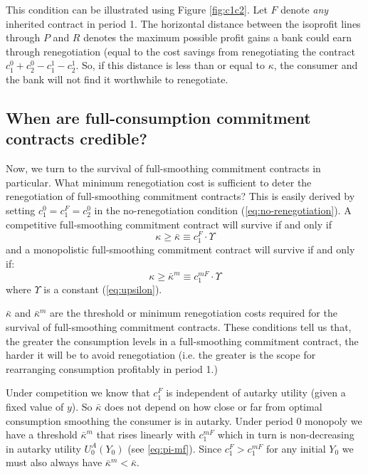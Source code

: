 \documentclass[11pt,english]{article}
\theoremstyle{plain}
\theoremstyle{definition}
\begin{document}
This condition can be illustrated using Figure \ref{fig:c1c2}.
Let $F$ denote \textit{any} inherited contract
in period 1. The horizontal distance between the isoprofit lines through
$P$ and $R$ denotes the maximum possible profit gains a bank could
earn through renegotiation (equal to the cost savings from renegotiating
the contract $c_{1}^{0}+c_{2}^{0}-c_{1}^{1}-c_{2}^{1}$. So, if this
distance is less than or equal to $\kappa$, the consumer and the
bank will not find it worthwhile to renegotiate.

\subsection{When are full-consumption commitment contracts credible?}

Now, we turn to the survival of full-smoothing commitment contracts
in particular. What minimum renegotiation cost is sufficient to deter
the renegotiation of full-smoothing commitment contracts? This is
easily derived by setting $c_{1}^{0}=c_{1}^{F}=c_{2}^{0}$ in the
no-renegotiation condition (\ref{eq:no-renegotiation}). A competitive
full-smoothing commitment contract will survive if and only if 
\begin{equation}
\kappa\geq\bar{\kappa}\equiv c_{1}^{F}\cdot\Upsilon\label{eq:kbar}
\end{equation}
and a monopolistic full-smoothing commitment contract will survive
if and only if: 
\begin{equation}
\kappa\geq\bar{\kappa}^{m}\equiv c_{1}^{mF}\cdot\Upsilon\label{eq:kbarM}
\end{equation}
where $\Upsilon$ is a constant (\ref{eq:upsilon}).

$\bar{\kappa}$ and $\bar{\kappa}^{m}$ are the threshold or minimum
renegotiation costs required for the survival of full-smoothing commitment
contracts. These conditions tell us that, the greater the consumption
levels in a full-smoothing commitment contract, the harder it will
be to avoid renegotiation (i.e. the greater is the scope for rearranging
consumption profitably in period 1.)

Under competition we know that $c_{1}^{F}$ is independent of autarky
utility (given a fixed value of $y$). So $\bar{\kappa}$ does not
depend on how close or far from optimal consumption smoothing the
consumer is in autarky. Under period 0 monopoly we have a threshold
$\bar{\kappa}^{m}$ that rises linearly with $c_{1}^{mF}$ which in
turn is non-decreasing in autarky utility $U_{0}^{A}(Y_{0})$ (see
\ref{eq:pi-mf}). Since $c_{1}^{F}>c_{1}^{mF}$ for any initial $Y_{0}$
we must also always have $\bar{\kappa}^{m}<\bar{\kappa}$.
\end{document}
